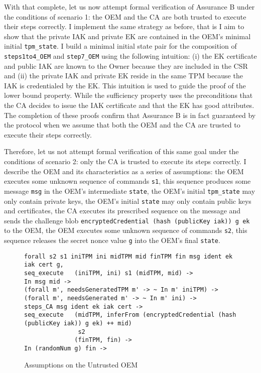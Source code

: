 With that complete, let us now attempt formal verification of Assurance B under the conditions of scenario 1: the OEM and the CA are both trusted to execute their steps correctly. I implement the same strategy as before, that is I aim to show that the private IAK and private EK are contained in the OEM's minimal initial \verb|tpm_state|. I build a minimal initial state pair for the composition of \verb|steps1to4_OEM| and \verb|step7_OEM| using the following intuition: (i) the EK certificate and public IAK are known to the Owner because they are included in the CSR and (ii) the private IAK and private EK reside in the same TPM because the IAK is credentialed by the EK. This intuition is used to guide the proof of the lower bound property. While the sufficiency property uses the preconditions that the CA decides to issue the IAK certificate and that the EK has good attributes. The completion of these proofs confirm that Assurance B is in fact guaranteed by the protocol when we assume that both the OEM and the CA are trusted to execute their steps correctly.

Therefore, let us not attempt formal verification of this same goal under the conditions of scenario 2: only the CA is trusted to execute its steps correctly. 
I describe the OEM and its characteristics as a series of assumptions: the OEM executes some unknown sequence of commands \verb|s1|, this sequence produces some message \verb|msg| in the OEM's intermediate \verb|state|, the OEM's initial \verb|tpm_state| may only contain private keys, the OEM's initial \verb|state| may only contain public keys and certificates, the CA executes its prescribed sequence on the message and sends the challenge blob \verb|encryptedCredential (hash (publicKey iak)) g ek| to the OEM, the OEM executes some unknown sequence of commands \verb|s2|, this sequence releases the secret nonce value \verb|g| into the OEM's final \verb|state|. 
\begin{figure}[h]
\begin{lstlisting}[language=Coq]
forall s2 s1 iniTPM ini midTPM mid finTPM fin msg ident ek iak cert g,
seq_execute   (iniTPM, ini) s1 (midTPM, mid) -> 
In msg mid ->
(forall m', needsGeneratedTPM m' -> ~ In m' iniTPM) ->
(forall m', needsGenerated m' -> ~ In m' ini) ->
steps_CA msg ident ek iak cert ->
seq_execute   (midTPM, inferFrom (encryptedCredential (hash (publicKey iak)) g ek) ++ mid) 
               s2 
              (finTPM, fin) ->
In (randomNum g) fin ->
\end{lstlisting}
\caption{Assumptions on the Untrusted OEM}
\label{fig:oem_assumptions}
\end{figure}








